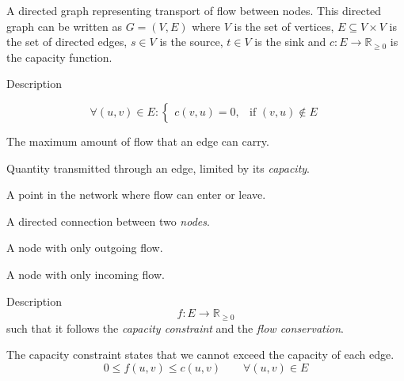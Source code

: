\documentclass[12pt, openany]{article}
\begin{document}
\begin{definition}
A directed graph representing transport of flow between nodes. This directed graph can be written as $G = (V,E)$ where \(V\) is the set of vertices, \(E \subseteq V \times V\) is the set of directed edges, \(s \in V\) is the source, \(t \in V\) is the sink and \(c : E \to \mathbb{R}_{\ge 0}\) is the capacity function.
\end{definition}

\begin{definition}
    Description

    \[
        \forall (u,v) \in E :
        \begin{cases}
        c(v,u) = 0, & \text{if } (v,u) \notin E
        \end{cases}
    \]
\end{definition}

\begin{definition}
The maximum amount of flow that an edge can carry.
\end{definition}

\begin{definition}[Flow]
Quantity transmitted through an edge, limited by its \emph{capacity}.
\end{definition}

\begin{definition}
A point in the network where flow can enter or leave.
\end{definition}

\begin{definition}
A directed connection between two \emph{nodes}.
\end{definition}

\begin{definition}[Source]
A node with only outgoing flow.
\end{definition}

\begin{definition}[Sink]
A node with only incoming flow.
\end{definition}

\begin{definition}
Description
    \[
f : E \to \mathbb{R}_{\ge 0}
\]
such that it follows the \emph{capacity constraint} and the \emph{flow conservation}.
\end{definition}

\begin{definition}
The capacity constraint states that we cannot exceed the capacity of each edge.
\[
    0 \le f(u,v) \le c(u,v)
    \qquad \forall (u,v)\in E
    \]
\end{definition}
\end{document}
